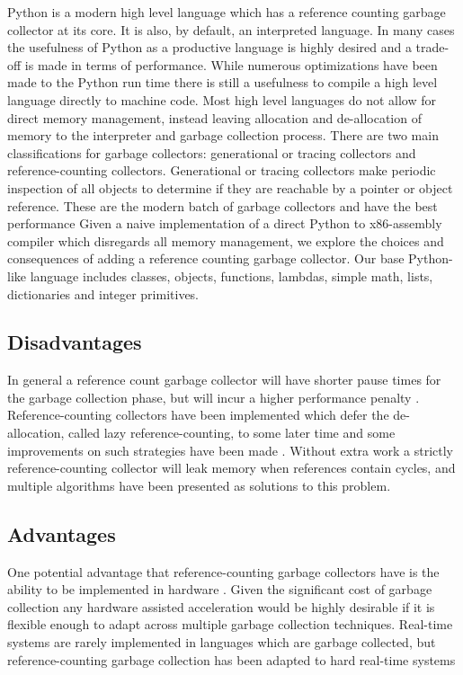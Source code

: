 \documentclass{sigplanconf}
\begin{document}
Python is a modern high level language which has a reference counting garbage collector at its core.  It is also, by default, an interpreted language.  In many cases the usefulness of Python as a productive language is highly desired and a trade-off is made in terms of performance.  While numerous optimizations have been made to the Python run time there is still a usefulness to compile a high level language directly to machine code.  Most high level languages do not allow for direct memory management, instead leaving allocation and de-allocation of memory to the interpreter and garbage collection process.
There are two main classifications for garbage collectors: generational or tracing collectors and reference-counting collectors.  Generational or tracing collectors make periodic inspection of all objects to determine if they are reachable by a pointer or object reference.  These are the modern batch of garbage collectors and have the best performance 
Given a naive implementation of a direct Python to x86-assembly compiler which disregards all memory management, we explore the choices and consequences of adding a reference counting garbage collector.  Our base Python-like language includes classes, objects, functions, lambdas, simple math, lists, dictionaries and integer primitives.
\subsection{Disadvantages}
In general a reference count garbage collector will have shorter pause times for the garbage collection phase, but will incur a higher performance penalty \cite{joisha}\cite{blackburn}.  Reference-counting collectors have been implemented which defer the de-allocation, called lazy reference-counting, to some later time and some improvements on such strategies have been made \cite{boehm}.  Without extra work a strictly reference-counting collector will leak memory when references contain cycles, and multiple algorithms have been presented as solutions to this problem.
\subsection{Advantages}
One potential advantage that reference-counting garbage collectors have is the ability to be implemented in hardware \cite{joao}.  Given the significant cost of garbage collection \cite{hertz} any hardware assisted acceleration would be highly desirable if it is flexible enough to adapt across multiple garbage collection techniques. 
Real-time systems are rarely implemented in languages which are garbage collected, but reference-counting garbage collection has been adapted to hard real-time systems
\end{document}
